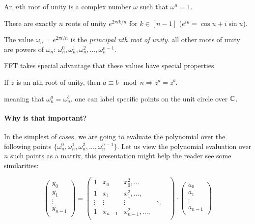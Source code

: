 \begin{defn}
An $n$th root of unity is a complex number $\omega$ such that
$\omega^n =1$.
\end{defn}

There are exactly $n$ roots of unity $e^{2\pi i k/n}$ for $k\in[n-1]$ 
($e^{iu}= \cos{u}+i \sin{u}$).

The value $\omega_n=e^{2\pi i/n}$ is the \emph{principal nth root of unity}.
all other roots of unity are powers of $\omega_n$:
 $\omega_n^0, \omega_n^1, \omega_n^2,\dots, \omega_n^{n-1}$.

FFT takes special advantage that these values have special properties.
\begin{lemma}\label{roots-of-unity-property}
If $z$ is an nth root of unity, then $ a \equiv b \mod n \Rightarrow z^a = z^b$.
\end{lemma}
meaning that $\omega_n^a = \omega_n^b$. one can label specific points on the unit circle over $\mathbb{C}$.

\paragraph{Why is that important?}

In the simplest of cases, we are going to evaluate the polynomial over the following
points $ \{\omega_n^0, \omega_n^1, \omega_n^2,\dots, \omega_n^{n-1}\}$.
Let us view the polynomial evaluation over $n$ such points as a matrix, this presentation
might help the reader see some similarities:


$$
\begin{pmatrix}
  y_0\\
  y_1\\
  \vdots \\
  y_{n-1}\\
\end{pmatrix}
=
\begin{pmatrix}
  1 & x_0 & x_0^2 ,\dots\\
  1 & x_1 & x_1^2, \dots,\\
  \vdots & \vdots & \vdots & \ddots & \\
  1 & x_{n-1} & x_{n-1}^2, \dots,\\
 \end{pmatrix}
 \cdot 
\begin{pmatrix}
  a_0\\
  a_1\\
  \vdots \\
  a_{n-1}\\
\end{pmatrix}
 $$

